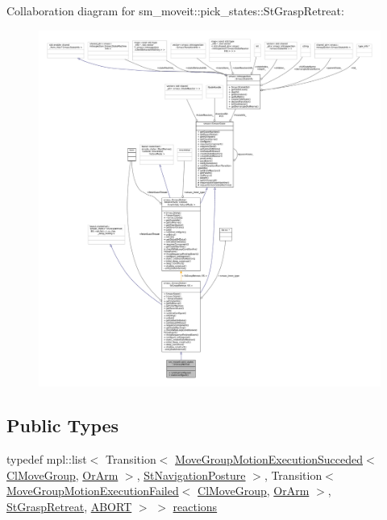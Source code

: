 Collaboration diagram for sm\+\_\+moveit\+:\+:pick\+\_\+states\+:\+:St\+Grasp\+Retreat\+:
\nopagebreak
\begin{figure}[H]
\begin{center}
\leavevmode
\includegraphics[width=350pt]{structsm__moveit_1_1pick__states_1_1StGraspRetreat__coll__graph}
\end{center}
\end{figure}
\subsection*{Public Types}
\begin{DoxyCompactItemize}
\item 
typedef mpl\+::list$<$ Transition$<$ \hyperlink{structsm__moveit_1_1cl__movegroup_1_1MoveGroupMotionExecutionSucceded}{Move\+Group\+Motion\+Execution\+Succeded}$<$ \hyperlink{classsm__moveit_1_1cl__movegroup_1_1ClMoveGroup}{Cl\+Move\+Group}, \hyperlink{classsm__moveit_1_1OrArm}{Or\+Arm} $>$, \hyperlink{structsm__moveit_1_1pick__states_1_1StNavigationPosture}{St\+Navigation\+Posture} $>$, Transition$<$ \hyperlink{structsm__moveit_1_1cl__movegroup_1_1MoveGroupMotionExecutionFailed}{Move\+Group\+Motion\+Execution\+Failed}$<$ \hyperlink{classsm__moveit_1_1cl__movegroup_1_1ClMoveGroup}{Cl\+Move\+Group}, \hyperlink{classsm__moveit_1_1OrArm}{Or\+Arm} $>$, \hyperlink{structsm__moveit_1_1pick__states_1_1StGraspRetreat}{St\+Grasp\+Retreat}, \hyperlink{classABORT}{A\+B\+O\+RT} $>$ $>$ \hyperlink{structsm__moveit_1_1pick__states_1_1StGraspRetreat_a8cb7952472046718830fb75585f0d11a}{reactions}
\end{DoxyCompactItemize}
